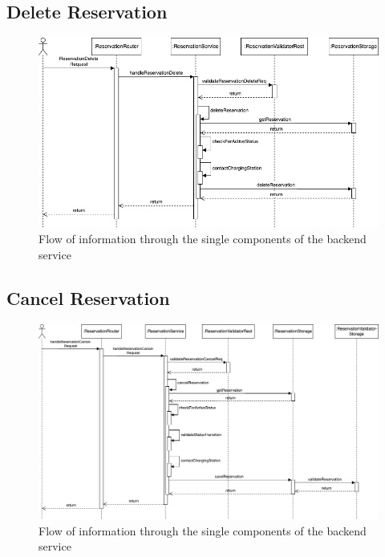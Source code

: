 \subsection{Delete Reservation}
\label{ch:Implementation:sec:Implemented Use Cases:ssec:Delete Reservation}

\begin{figure}[!ht]
    \centering
    \includegraphics[scale=0.4]{resources/images/main/6_implementation/processes/ReservationDelete.png}
    \caption{Flow of information through the single components of the backend service}
    \label{fig:delete-reservation-seq-flow}
\end{figure}

\subsection{Cancel Reservation}
\label{ch:Implementation:sec:Implemented Use Cases:ssec:Cancel Reservation}


\begin{figure}[!ht]
    \centering
    \includegraphics[scale=0.4]{resources/images/main/6_implementation/processes/ReservationCancel.png}
    \caption{Flow of information through the single components of the backend service}
    \label{fig:cancel-reservation-seq-flow}
\end{figure}

